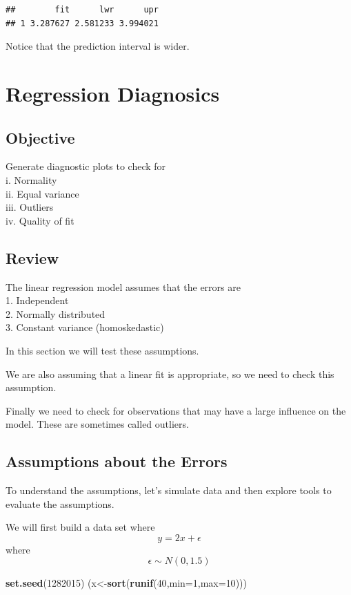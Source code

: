 \documentclass[]{book}
\newenvironment{Shaded}{\begin{snugshade}}{\end{snugshade}}
\newcommand{\KeywordTok}[1]{\textcolor[rgb]{0.13,0.29,0.53}{\textbf{#1}}}
\newcommand{\DataTypeTok}[1]{\textcolor[rgb]{0.13,0.29,0.53}{#1}}
\newcommand{\DecValTok}[1]{\textcolor[rgb]{0.00,0.00,0.81}{#1}}
\newcommand{\NormalTok}[1]{#1}
\theoremstyle{definition}
\theoremstyle{definition}
\theoremstyle{definition}
\theoremstyle{remark}
\begin{document}
\begin{verbatim}
##        fit      lwr      upr
## 1 3.287627 2.581233 3.994021
\end{verbatim}

Notice that the prediction interval is wider.

\hypertarget{L32}{\section{Regression Diagnosics}\label{L32}}

\subsection{Objective}\label{objective-2}

Generate diagnostic plots to check for\\
i. Normality\\
ii. Equal variance\\
iii. Outliers\\
iv. Quality of fit

\subsection{Review}\label{review-9}

The linear regression model assumes that the errors are\\
1. Independent\\
2. Normally distributed\\
3. Constant variance (homoskedastic)

In this section we will test these assumptions.

We are also assuming that a linear fit is appropriate, so we need to
check this assumption.

Finally we need to check for observations that may have a large
influence on the model. These are sometimes called outliers.

\subsection{Assumptions about the
Errors}\label{assumptions-about-the-errors}

To understand the assumptions, let's simulate data and then explore
tools to evaluate the assumptions.

We will first build a data set where \[y=2x+\epsilon\] where
\[\epsilon \sim N(0,1.5)\]

\begin{Shaded}
\begin{Highlighting}[]
\KeywordTok{set.seed}\NormalTok{(}\DecValTok{1282015}\NormalTok{)}
\NormalTok{(x<-}\KeywordTok{sort}\NormalTok{(}\KeywordTok{runif}\NormalTok{(}\DecValTok{40}\NormalTok{,}\DataTypeTok{min=}\DecValTok{1}\NormalTok{,}\DataTypeTok{max=}\DecValTok{10}\NormalTok{)))}
\end{Highlighting}
\end{Shaded}
\end{document}
